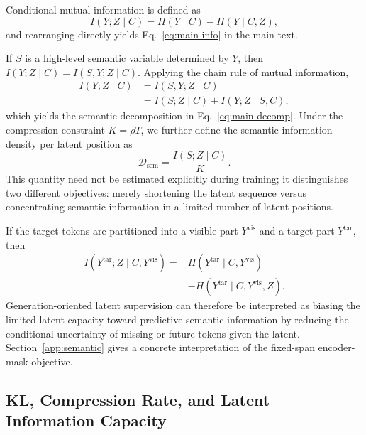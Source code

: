 Conditional mutual information is defined as
\begin{equation}
    I(Y;Z\mid C)
    =
    H(Y\mid C)-H(Y\mid C,Z),
    \label{eq:app-mi-def}
\end{equation}
and rearranging directly yields Eq.~\eqref{eq:main-info} in the main text.

If $S$ is a high-level semantic variable determined by $Y$, then $I(Y;Z\mid C)=I(S,Y;Z\mid C)$. Applying the chain rule of mutual information,
\begin{equation}
\begin{aligned}
    I(Y;Z\mid C)
    &=I(S,Y;Z\mid C)\\
    &=I(S;Z\mid C)+I(Y;Z\mid S,C),
\end{aligned}
\label{eq:app-chain}
\end{equation}
which yields the semantic decomposition in Eq.~\eqref{eq:main-decomp}. Under the compression constraint $K=\rho T$, we further define the semantic information density per latent position as
\begin{equation}
    \mathcal D_{\mathrm{sem}}
    =\frac{I(S;Z\mid C)}{K}.
    \label{eq:app-sem-density}
\end{equation}
This quantity need not be estimated explicitly during training; it distinguishes two different objectives: merely shortening the latent sequence versus concentrating semantic information in a limited number of latent positions.

If the target tokens are partitioned into a visible part $Y^{\mathrm{vis}}$ and a target part $Y^{\mathrm{tar}}$, then
\begin{equation}
\begin{aligned}
    I(Y^{\mathrm{tar}};Z\mid C,Y^{\mathrm{vis}})
    ={}&H(Y^{\mathrm{tar}}\mid C,Y^{\mathrm{vis}})\\
    &-H(Y^{\mathrm{tar}}\mid C,Y^{\mathrm{vis}},Z).
\end{aligned}
\label{eq:app-predictive-info}
\end{equation}
Generation-oriented latent supervision can therefore be interpreted as biasing the limited latent capacity toward predictive semantic information by reducing the conditional uncertainty of missing or future tokens given the latent. Section~\ref{app:semantic} gives a concrete interpretation of the fixed-span encoder-mask objective.

\subsection{KL, Compression Rate, and Latent Information Capacity}

